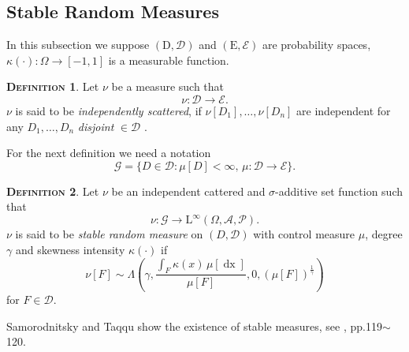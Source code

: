 \documentclass[a4paper, twoside, 11pt]{article}
\theoremstyle{definition}
\newtheorem{definition}{\scshape Definition}[section]
\newcommand{\brkt}[1]{\left({#1} \right)}
\begin{document}
\subsection{Stable Random Measures}
In this subsection we suppose $(\mathrm{D}, \mathscr{D})$ and $(\mathrm{E}, \mathscr{E})$ are probability spaces, $\kappa(\cdot) : \Omega \rightarrow [-1, 1]$ is a measurable function.
\begin{definition}
	Let $\nu$ be a measure such that
	\begin{equation}
	  \nu : \mathscr{D} \rightarrow \mathscr{E}.\nonumber
	\end{equation}
	$\nu$ is said to be \emph{independently scattered}, if $\nu[D_1], \dots, \nu[D_n]$ are independent for any $D_1,\dots, D_n$ \emph{disjoint} $\in \mathscr{D}$ .
\end{definition}

For the next definition we need a notation
\begin{equation}
  \mathscr{G} = \{D \in \mathscr{D} : \mu[D] < \infty,\, \mu : \mathscr{D} \rightarrow \mathscr{E}\}.
\end{equation}
\begin{definition}
  Let $\nu$ be an independent cattered and $\sigma$-additive set function such that
\begin{equation*}
  \nu: \mathscr{G}  \rightarrow \mathrm{L}^{\infty}(\Omega, \mathscr{A}, \mathcal{P}). 
\end{equation*}
$\nu$ is said to be \emph{stable random measure} on $(D, \mathscr{D})$ with control measure $\mu$, degree $\gamma$ and skewness intensity $\kappa(\cdot)$ if 
\begin{equation}
  \nu[F] \sim \Lambda\brkt{\gamma, \frac{\int_F \kappa(x)\, \mu[\mathop{dx}]}{\mu[F]}, 0, (\mu[F])^{\frac{1}{\gamma}}}
\end{equation}
for $F \in \mathscr{D}$.
\end{definition}
Samorodnitsky and Taqqu show the existence of stable measures, see \cite{samorodnitsky}, pp.119$\sim$120.
\end{document}

